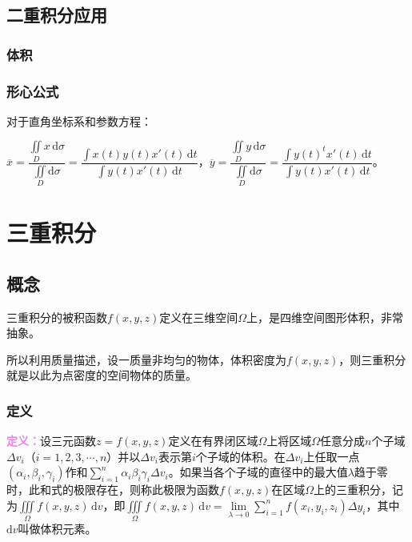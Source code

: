 \documentclass[UTF8, 12pt]{ctexart}
\begin{document}
        \subsection{二重积分应用}

        \subsubsection{体积}

        \subsubsection{形心公式}

        对于直角坐标系和参数方程：

        $\overline{x}=\dfrac{\iint\limits_Dx\,\textrm{d}\sigma}{\iint\limits_D\textrm{d}\sigma}=\dfrac{\int x(t)y(t)x'(t)\,\textrm{d}t}{\int y(t)x'(t)\,\textrm{d}t}$，$\overline{y}=\dfrac{\iint\limits_Dy\,\textrm{d}\sigma}{\iint\limits_D\textrm{d}\sigma}=\dfrac{\int y(t)^tx'(t)\,\textrm{d}t}{\int y(t)x'(t)\,\textrm{d}t}$。

        \section{三重积分}

        \subsection{概念}

        三重积分的被积函数$f(x,y,z)$定义在三维空间$\Omega$上，是四维空间图形体积，非常抽象。

        所以利用质量描述，设一质量非均匀的物体，体积密度为$f(x,y,z)$，则三重积分就是以此为点密度的空间物体的质量。

        \subsubsection{定义}

        \textcolor{violet}{\textbf{定义：}}设三元函数$z=f(x,y,z)$定义在有界闭区域$\Omega$上将区域$\Omega$任意分成$n$个子域$\Delta v_i$（$i=1,2,3,\cdots,n$）并以$\Delta v_i$表示第$i$个子域的体积。在$\Delta v_i$上任取一点$(\alpha_i,\beta_i,\gamma_i)$作和$\sum\limits_{i=1}^n\alpha_i\beta_i\gamma_i\Delta v_i$。如果当各个子域的直径中的最大值$\lambda$趋于零时，此和式的极限存在，则称此极限为函数$f(x,y,z)$在区域$\Omega$上的三重积分，记为$\iiint\limits_\Omega f(x,y,z)\,\textrm{d}v$，即$\iiint\limits_\Omega f(x,y,z)\,\textrm{d}v=\lim\limits_{\lambda\to0}\sum\limits_{i=1}^nf(x_i,y_i,z_i)\Delta y_i$，其中$\textrm{d}v$叫做体积元素。
\end{document}
